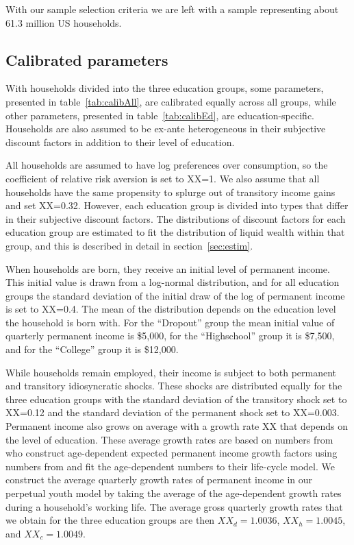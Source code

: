 \documentclass[11pt]{article}
\begin{document}
With our sample selection criteria we are left with a sample representing about 61.3 million US households.

\subsection{Calibrated parameters} 

With households divided into the three education groups, some parameters, presented in table~\ref{tab:calibAll}, are calibrated equally across all groups, while other parameters, presented in table~\ref{tab:calibEd}, are education-specific. Households are also assumed to be ex-ante heterogeneous in their subjective discount factors in addition to their level of education. 

All households are assumed to have log preferences over consumption, so the coefficient of relative risk aversion is set to XX=1. We also assume that all households have the same propensity to splurge out of transitory income gains and set XX=0.32. However, each education group is divided into types that differ in their subjective discount factors. The distributions of discount factors for each education group are estimated to fit the distribution of liquid wealth within that group, and this is described in detail in section~\ref{sec:estim}. 

When households are born, they receive an initial level of permanent income. This initial value is drawn from a log-normal distribution, and for all education groups the standard deviation of the initial draw of the log of permanent income is set to XX=0.4. The mean of the distribution depends on the education level the household is born with. For the ``Dropout'' group the mean initial value of quarterly permanent income is \$5,000, for the ``Highschool'' group it is \$7,500, and for the ``College'' group it is \$12,000. 

While households remain employed, their income is subject to both permanent and transitory idiosyncratic shocks. These shocks are distributed equally for the three education groups with the standard deviation of the transitory shock set to XX=0.12 and the standard deviation of the permanent shock set to XX=0.003. Permanent income also grows on average with a growth rate XX that depends on the level of education. These average growth rates are based on numbers from \citet{carroll2020modeling} who construct age-dependent expected permanent income growth factors using numbers from \citet{cagetti2003wealth} and fit the age-dependent numbers to their life-cycle model. We construct the average quarterly growth rates of permanent income in our perpetual youth model by taking the average of the age-dependent growth rates during a household's working life. The average gross quarterly growth rates that we obtain for the three education groups are then $XX_d=1.0036$, $XX_h=1.0045$, and $XX_c=1.0049$.
\end{document}
